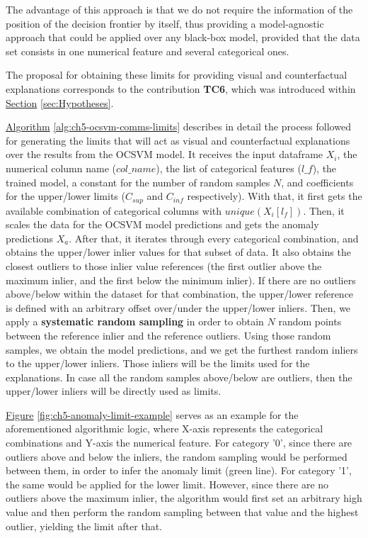 The advantage of this approach is that we do not require the information of the position of the decision frontier by itself, thus providing a model-agnostic approach that could be applied over any black-box model, provided that the data set consists in one numerical feature and several categorical ones. 

The proposal for obtaining these limits for providing visual and counterfactual explanations corresponds to the contribution \textbf{TC6}, which was introduced within \hyperref[sec:Hypotheses]{Section} \ref{sec:Hypotheses}.

\hyperref[alg:ch5-ocsvm-comms-limits]{Algorithm} \ref{alg:ch5-ocsvm-comms-limits} describes in detail the process followed for generating the limits that will act as visual and counterfactual explanations over the results from the OCSVM model. It receives the input dataframe $X_i$, the numerical column name ($col\_name$), the list of categorical features ($l\_f$), the trained model, a constant for the number of random samples $N$, and coefficients for the upper/lower limits ($C_{sup}$ and $C_{inf}$ respectively). With that, it first gets the available combination of categorical columns with $unique(X_i[l_f])$. Then, it scales the data for the OCSVM model predictions and gets the anomaly predictions $X_a$. After that, it iterates through every categorical combination, and obtains the upper/lower inlier values for that subset of data. It also obtains the closest outliers to those inlier value references (the first outlier above the maximum inlier, and the first below the minimum inlier). If there are no outliers above/below within the dataset for that combination, the upper/lower reference is defined with an arbitrary offset over/under the upper/lower inliers. Then, we apply a \textbf{systematic random sampling} in order to obtain $N$ random points between the reference inlier and the reference outliers. Using those random samples, we obtain the model predictions, and we get the furthest random inliers to the upper/lower inliers. Those inliers will be the limits used for the explanations. In case all the random samples above/below are outliers, then the upper/lower inliers will be directly used as limits.

\hyperref[fig:ch5-anomaly-limit-example]{Figure} \ref{fig:ch5-anomaly-limit-example} serves as an example for the aforementioned algorithmic logic, where X-axis represents the categorical combinations and Y-axis the numerical feature. For category '0', since there are outliers above and below the inliers, the random sampling would be performed between them, in order to infer the anomaly limit (green line). For category '1', the same would be applied for the lower limit. However, since there are no outliers above the maximum inlier, the algorithm would first set an arbitrary high value and then perform the random sampling between that value and the highest outlier, yielding the limit after that. 


